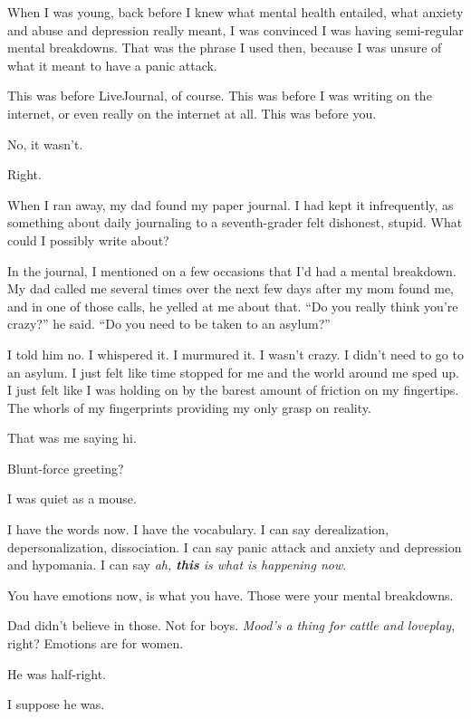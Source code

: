 \label{ally:6}
\begin{paracol}{2}
  \begin{leftcolumn}

\noindent When I was young, back before I knew what mental health entailed, what anxiety and abuse and depression really meant, I was convinced I was having semi-regular mental breakdowns. That was the phrase I used then, because I was unsure of what it meant to have a panic attack.

This was before LiveJournal, of course. This was before I was writing on the internet, or even really on the internet at all. This was before you.

\begin{ally}
No, it wasn't.
\end{ally}
Right.

When I ran away, my dad found my paper journal. I had kept it infrequently, as something about daily journaling to a seventh-grader felt dishonest, stupid. What could I possibly write about?

In the journal, I mentioned on a few occasions that I'd had a mental breakdown. My dad called me several times over the next few days after my mom found me, and in one of those calls, he yelled at me about that. ``Do you really think you're crazy?'' he said. ``Do you need to be taken to an asylum?''

I told him no. I whispered it. I murmured it. I wasn't crazy. I didn't need to go to an asylum. I just felt like time stopped for me and the world around me sped up. I just felt like I was holding on by the barest amount of friction on my fingertips. The whorls of my fingerprints providing my only grasp on reality.

\begin{ally}
That was me saying hi.
\end{ally}
Blunt-force greeting?

\begin{ally}
I was quiet as a mouse.
\end{ally}
I have the words now. I have the vocabulary. I can say derealization, depersonalization, dissociation. I can say panic attack and anxiety and depression and hypomania. I can say \emph{ah, \textbf{this} is what is happening now}.

\begin{ally}
You have emotions now, is what you have. Those were your mental breakdowns.
\end{ally}
Dad didn't believe in those. Not for boys. \emph{Mood's a thing for cattle and loveplay}, right? Emotions are for women.

\begin{ally}
He was half-right.
\end{ally}
I suppose he was.

\newpage
\end{leftcolumn}
\end{paracol}
